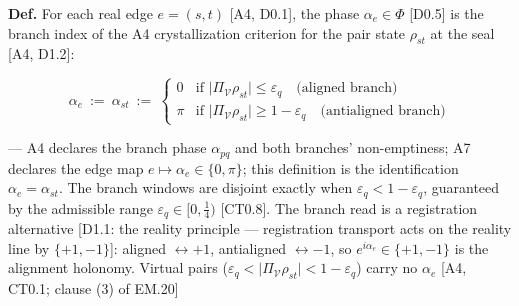 \begin{definition}\label{tag:Def-EM-20}
\textbf{Def.} For each real edge $e=(s,t)$ [A4, D0.1], the phase $\alpha_e\in\Phi$ [D0.5] is the branch index of the A4 crystallization criterion for the pair state $\rho_{st}$ at the seal [A4, D1.2]:

\[
\alpha_e\ :=\ \alpha_{st}\ :=\ \begin{cases} 0 & \text{if } \bigl|\Pi_{\mathcal V}\rho_{st}\bigr|\le\varepsilon_q \quad \text{(aligned branch)} \\ \pi & \text{if } \bigl|\Pi_{\mathcal V}\rho_{st}\bigr|\ge 1-\varepsilon_q \quad \text{(antialigned branch)} \end{cases}
\]

— A4 declares the branch phase $\alpha_{pq}$ and both branches' non-emptiness; A7 declares the edge map $e\mapsto\alpha_e\in\{0,\pi\}$; this definition is the identification $\alpha_e=\alpha_{st}$. The branch windows are disjoint exactly when $\varepsilon_q<1-\varepsilon_q$, guaranteed by the admissible range $\varepsilon_q\in[0,\tfrac14)$ [CT0.8]. The branch read is a registration alternative [D1.1: the reality principle — registration transport acts on the reality line by $\{+1,-1\}$]: aligned $\leftrightarrow+1$, antialigned $\leftrightarrow-1$, so $e^{i\alpha_e}\in\{+1,-1\}$ is the alignment holonomy. Virtual pairs ($\varepsilon_q<\bigl|\Pi_{\mathcal V}\rho_{st}\bigr|<1-\varepsilon_q$) carry no $\alpha_e$ [A4, CT0.1; clause (3) of EM.20]

\end{definition}


